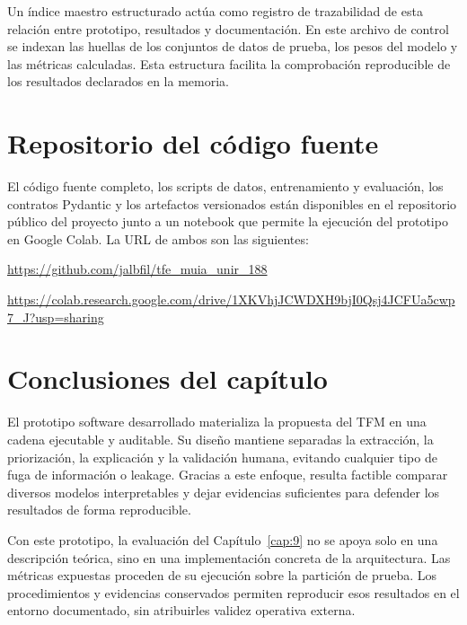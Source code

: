 Un índice maestro estructurado actúa como registro de trazabilidad de esta relación entre prototipo, resultados y documentación. En este archivo de control se indexan las huellas de los conjuntos de datos de prueba, los pesos del modelo y las métricas calculadas. Esta estructura facilita la comprobación reproducible de los resultados declarados en la memoria.

\section{Repositorio del código fuente}

El código fuente completo, los scripts de datos, entrenamiento y evaluación, los contratos Pydantic y los artefactos versionados están disponibles en el repositorio público del proyecto junto a un notebook que permite la ejecución del prototipo en Google Colab. La URL de ambos son las siguientes:

\begin{center}
\url{https://github.com/jalbfil/tfe_muia_unir_188}
\end{center}


\begin{center}
\url{https://colab.research.google.com/drive/1XKVhjJCWDXH9bjI0Qsj4JCFUa5cwp7_J?usp=sharing}
\end{center}

\section{Conclusiones del capítulo}

El prototipo software desarrollado materializa la propuesta del TFM en una cadena ejecutable y auditable. Su diseño mantiene separadas la extracción, la priorización, la explicación y la validación humana, evitando cualquier tipo de fuga de información o leakage. Gracias a este enfoque, resulta factible comparar diversos modelos interpretables y dejar evidencias suficientes para defender los resultados de forma reproducible.

Con este prototipo, la evaluación del Capítulo~\ref{cap:9} no se apoya solo en una descripción teórica, sino en una implementación concreta de la arquitectura. Las métricas expuestas proceden de su ejecución sobre la partición de prueba. Los procedimientos y evidencias conservados permiten reproducir esos resultados en el entorno documentado, sin atribuirles validez operativa externa.

